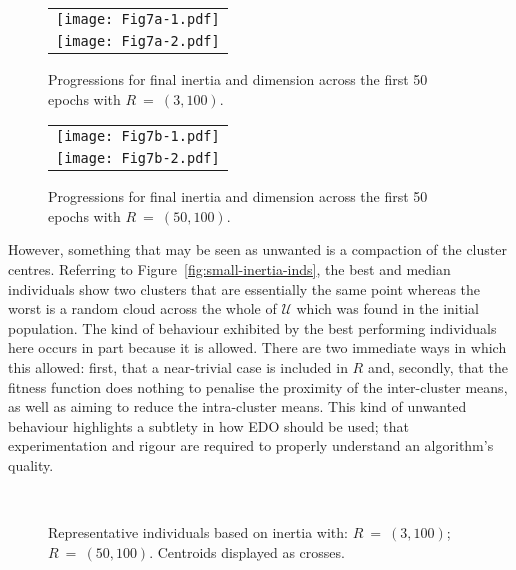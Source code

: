 \documentclass[11pt]{article}
\newlength{\imgwidth}
\begin{document}
\addtocounter{figure}{1}
\begin{figure}[htbp]
    \ContinuedFloat%
    \centering
    \begin{tabular}{c}
        \texttt{[image: Fig7a-1.pdf]}
        \\
        \texttt{[image: Fig7a-2.pdf]}
    \end{tabular}
    \caption{%
        Progressions for final inertia and dimension across the first 50
        epochs with \(R~=~(3,100)\).
    }\label{fig:small-inertia-50}
\end{figure}

\begin{figure}[htbp]
    \ContinuedFloat%
    \centering
    \begin{tabular}{c}
        \texttt{[image: Fig7b-1.pdf]}
        \\
        \texttt{[image: Fig7b-2.pdf]}
    \end{tabular}
    \caption{%
        Progressions for final inertia and dimension across the first 50 epochs
        with \(R~=~(50,100)\).
    }\label{fig:large-inertia-50}
\end{figure}

However, something that may be seen as unwanted is a compaction of the cluster
centres. Referring to Figure~\ref{fig:small-inertia-inds}, the best and median
individuals show two clusters that are essentially the same point whereas the
worst is a random cloud across the whole of \(\mathcal{U}\) which was found in
the initial population. The kind of behaviour exhibited by the best performing
individuals here occurs in part because it is allowed. There are two immediate
ways in which this allowed: first, that a near-trivial case is included in \(R\)
and, secondly, that the fitness function does nothing to penalise the proximity
of the inter-cluster means, as well as aiming to reduce the intra-cluster means.
This kind of unwanted behaviour highlights a subtlety in how EDO should be used;
that experimentation and rigour are required to properly understand an
algorithm's quality.

\begin{figure}[htbp]
    \centering
    \\

    \caption[]{%
        Representative individuals based on inertia with:
         \(R~=~(3,100)\);
         \(R~=~(50,100)\). Centroids displayed as
        crosses.
    }\label{fig:inertia-inds}
\end{figure}
\end{document}
